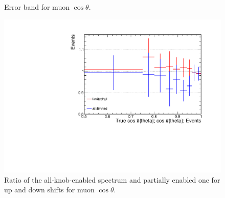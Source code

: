 \documentclass[12pt,a4paper,final]{iopart}
\begin{document}
\begin{figure}[h]
  \centering
  \hfill
  \caption{Error band for muon $\cos\theta$.}
  \label{fig:error_muang}
\end{figure}
\begin{figure}[h]
  \centering
  \includegraphics[angle=-90,origin=c, width=.9\textwidth]{figures/t_cos_ratio.pdf}
  \caption{Ratio of the all-knob-enabled spectrum and partially enabled one for up and down shifts for muon $\cos\theta$.}
  \label{fig:ratio_muang}
\end{figure}
\end{document}
